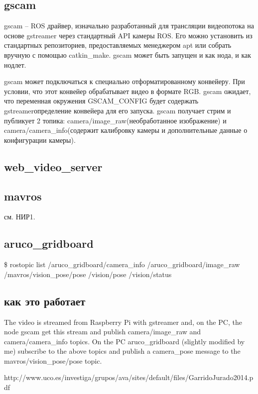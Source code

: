 \subsection{gscam}
gscam -- ROS драйвер, изначально разработанный для трансляции видеопотока на основе gstreamer через стандартный API камеры ROS. Его можно установить из стандартных репозиториев, предоставляемых менеджером apt или собрать вручную с помощью catkin\_make. gscam может быть запущен и как нода, и как нодлет.

gscam может подключаться к специально отформатированному конвейеру. При условии, что этот конвейер обрабатывает видео в формате RGB. gscam ожидает, что переменная окружения GSCAM\_CONFIG будет содержать gstreamerопределение конвейера для его запуска.
gscam получает стрим и публикует 2 топика: camera/image\_raw(необработанное изображение) и camera/camera\_info(содержит калибровку камеры и дополнительные данные о конфигурации камеры).
\subsection{web\_video\_server}
\subsection{mavros}
см. НИР1.
\subsection{aruco\_gridboard}

\$ rostopic list
/aruco\_gridboard/camera\_info
/aruco\_gridboard/image\_raw
/mavros/vision\_pose/pose
/vision/pose
/vision/status

\subsection{как это работает}
The video is streamed from Raspberry Pi with gstreamer and, on the PC, the node gscam get this stream and publish camera/image\_raw and camera/camera\_info topics.
On the PC aruco\_gridboard (slightly modified by me) subscribe to the above topics and publish a camera\_pose message to the mavros/vision\_pose/pose topic.


http://www.uco.es/investiga/grupos/ava/sites/default/files/GarridoJurado2014.pdf
